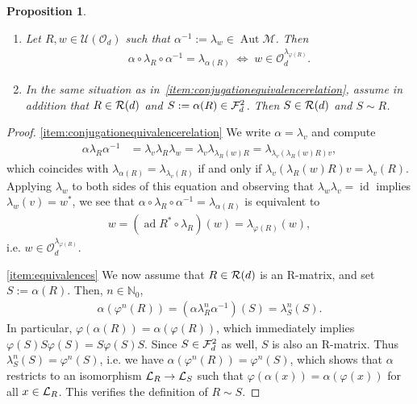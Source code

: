 \documentclass[12pt,a4paper]{amsart}
\numberwithin{equation}{section}
\newtheorem{proposition}[theorem]{Proposition}
\theoremstyle{remark}
\def\Aut{\operatorname{Aut}}
\def\id{\operatorname{id}}
\def\id{\operatorname{id}}
\DeclareMathOperator{\ad}{ad}
\newcommand{\Nl}{\mathbb{N}}
\newcommand{\la}{\lambda}
\newcommand{\CM}[0]{\mathcal{M}} \newcommand{\CN}[0]{\mathcal{N}}
\newcommand{\CO}[0]{\mathcal{O}} \newcommand{\CP}[0]{\mathcal{P}}
\newcommand{\CU}[0]{\mathcal{U}} \newcommand{\CV}[0]{\mathcal{V}}
\begin{document}
\begin{proposition}\label{proposition:conjugation-vs-fixed-points}
    \leavevmode
    \begin{enumerate}
     \item\label{item:conjugationequivalencerelation}  Let $R,w\in\CU(\CO_d)$ such that $\alpha^{-1}:=\lambda_w\in\Aut\CM$. Then  
    \begin{align}\label{eq:conjug-eqn}
    \alpha\circ\lambda_R\circ\alpha^{-1}=\lambda_{\alpha(R)}
    \;\Longleftrightarrow\;
    w\in\CO_d^{\lambda_{\varphi(R)}}.
    \end{align}
    \item\label{item:equivalences} In the same situation as in~\ref{item:conjugationequivalencerelation}, assume in addition that $R\in\mathcal{R}(d)$ and $S:=\alpha(R)\in\mathcal{F}_d^2$. Then $S\in\mathcal{R}(d)$ and $S\sim R$.
    \end{enumerate}
\end{proposition}
\begin{proof}
    \ref{item:conjugationequivalencerelation} We write $\alpha=\lambda_v$ and compute
 \begin{align*}
  \alpha\lambda_R\alpha^{-1}
  &=
  \lambda_v\lambda_R\lambda_w
  =
  \lambda_v\lambda_{\lambda_R(w)R}
  =
  \lambda_{\lambda_v(\lambda_R(w)R)v},
 \end{align*}
 which coincides with $\lambda_{\alpha(R)}=\lambda_{\lambda_v(R)}$ if and only if $\lambda_v(\lambda_R(w)R)v=\lambda_v(R)$. Applying $\lambda_w$ to both sides of this equation and observing that $\lambda_w\lambda_v=\id$ implies $\lambda_w(v)=w^*$, we see that $\alpha\circ\lambda_R\circ\alpha^{-1}=\lambda_{\alpha(R)}$ is equivalent to 
 \begin{align}
  w=(\ad R^*\circ\lambda_R)(w)=\lambda_{\varphi(R)}(w),
 \end{align}
 i.e. $w\in\CO_d^{\lambda_{\varphi(R)}}$.
 
 \ref{item:equivalences} We now assume that $R\in\mathcal{R}(d)$ is an R-matrix, and set $S:=\alpha(R)$. Then, $n\in\Nl_0$,
 \begin{align*}
  \alpha(\varphi^n(R))
  =
  (\alpha\la_R^n\alpha^{-1})(S)
  =
  \la_S^n(S).
 \end{align*}
	In particular, $\varphi(\alpha(R))=\alpha(\varphi(R))$, which immediately implies $\varphi(S)S\varphi(S)=S\varphi(S)S$. Since $S\in\mathcal{F}_d^2$ as well, $S$ is also an R-matrix. Thus $\la_S^n(S)=\varphi^n(S)$, i.e. we have $\alpha(\varphi^n(R))=\varphi^n(S)$, which shows that $\alpha$ restricts to an isomorphism $\mathcal{L}_R\to\mathcal{L}_S$ such that $\varphi(\alpha(x))=\alpha(\varphi(x))$ for all $x\in\mathcal{L}_R$. This verifies the definition of $R\sim S$.
\end{proof}
\end{document}
